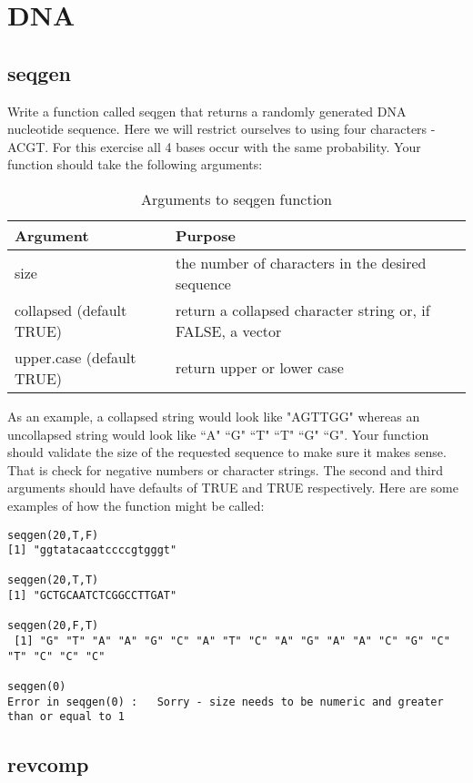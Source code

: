 \documentclass{article}
\begin{document}
\section{DNA}

\subsection{seqgen}Write a function called seqgen that returns a randomly generated DNA nucleotide sequence. Here we will restrict ourselves to using four characters - ACGT. For this exercise all 4 bases occur with the same probability. Your function should take the following arguments:

\begin{table}[ht]
\caption{Arguments to seqgen function}
\begin{tabular}{l | l}
\hline\hline
Argument & Purpose \\ [1ex]
\hline
size & the number of characters in the desired sequence \\ [1ex]
\hline 
collapsed (default TRUE) & return a collapsed character string or, if FALSE, a vector  \\ [1ex]
\hline
upper.case (default TRUE) & return upper or lower case \\ [1ex]
\end{tabular}
\label{table:nonlin}
\end{table}

As an example, a collapsed string would look like  "AGTTGG" whereas an uncollapsed string would look like ``A" ``G" ``T" ``T" ``G" ``G". Your function should validate the size of the requested sequence to make sure it makes sense. That is check for negative numbers or character strings. The second and third arguments should have defaults of TRUE and TRUE respectively. Here are some examples of how the function might be called:

\begin{verbatim}
seqgen(20,T,F)
[1] "ggtatacaatccccgtgggt"

seqgen(20,T,T)
[1] "GCTGCAATCTCGGCCTTGAT"

seqgen(20,F,T)
 [1] "G" "T" "A" "A" "G" "C" "A" "T" "C" "A" "G" "A" "A" "C" "G" "C" "T" "C" "C" "C"

seqgen(0)
Error in seqgen(0) :   Sorry - size needs to be numeric and greater than or equal to 1

\end{verbatim}

\subsection{revcomp} 
\end{document}
